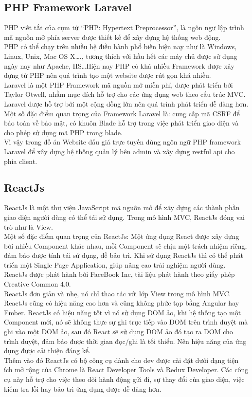 \documentclass{article}
\begin{document}
\subsection{PHP Framework Laravel}
PHP viết tắt của cụm từ “PHP: Hypertext Preprocessor”, là ngôn ngữ lập trình mã nguồn mở phía server được thiết kế để xây dựng hệ thống web động.\\
PHP có thể chạy trên nhiều hệ điều hành phổ biến hiện nay như là Windows, Linux, Unix, Mac OS X…., tương thích với hầu hết các máy chủ được sử dụng ngày nay như Apache, IIS…Hiện nay PHP có khá nhiều Framework được xây dựng từ PHP nên quá trình tạo một website được rút gọn khá nhiều. \\
Laravel là một PHP Framework mã nguồn mở miễn phí, được phát triển bởi Taylor Otwell, nhằm mục đích hỗ trợ cho các ứng dụng web theo cấu trúc MVC. Laravel được hỗ trợ bởi một cộng đồng lớn nên quá trình phát triển dễ dàng hơn. \\
Một số đặc điểm quan trọng của Framework Laravel là: cung cấp mã CSRF để bảo toàn về bảo mật, có khuôn Blade hỗ trợ trong việc phát triển giao diện và cho phép sử dụng mã PHP trong blade.\\
Vì vậy trong đồ án Website đấu giá trực tuyến dùng ngôn ngữ PHP framework Laravel để xây dựng hệ thống quản lý bên admin và xây dựng restful api cho phía client. 
\subsection{ReactJs}
ReactJs là một thư viện JavaScript mã nguồn mở để xây dựng các thành phần giao diện người dùng có thể tái sử dụng. Trong mô hình MVC, ReactJs đóng vai trò như là View.\\
Một số đặc điểm quan trọng của ReactJs: Một ứng dụng React được xây dựng bởi nhiều Component khác nhau, mỗi Component sẽ chịu một trách nhiệm riêng, đảm bảo được tính tái sử dụng, dễ bảo trì. Khi sử dụng ReactJs thì có thể phát triển một Single Page Application, giúp nâng cao trải nghiệm người dùng. ReactJs được phát hành bởi FaceBook Inc, tài liệu phát hành theo giấy phép Creative Common 4.0.\\
ReactJs đơn giản và nhẹ, nó chỉ thao tác với lớp View trong mô hình MVC. ReactJs cũng có hiệu năng cao hơn và cũng không phức tạp bằng Angular hay Ember. ReactJs có hiệu năng tốt vì nó sử dụng DOM ảo, khi hệ thống tạo một Component mới, nó sẽ không thực sự ghi trực tiếp vào DOM trên trình duyệt mà ghi vào một DOM ảo, sau đó React sẽ sử dụng DOM ảo đó tạo ra DOM cho trình duyệt, đảm bảo được thời gian đọc/ghi là tối thiểu. Nên hiệu năng của ứng dụng được cải thiện đáng kể. \\
Thêm vào đó ReactJs có bộ công cụ dành cho dev được cài đặt dưới dạng tiện ích mở rộng của Chrome là React Developer Tools và Redux Developer. Các công cụ này hỗ trợ cho việc theo dõi hành động gửi đi, sự thay đổi của giao diện, việc kiểm tra lỗi hay bảo trì ứng dụng được dễ dàng hơn.
\end{document}
